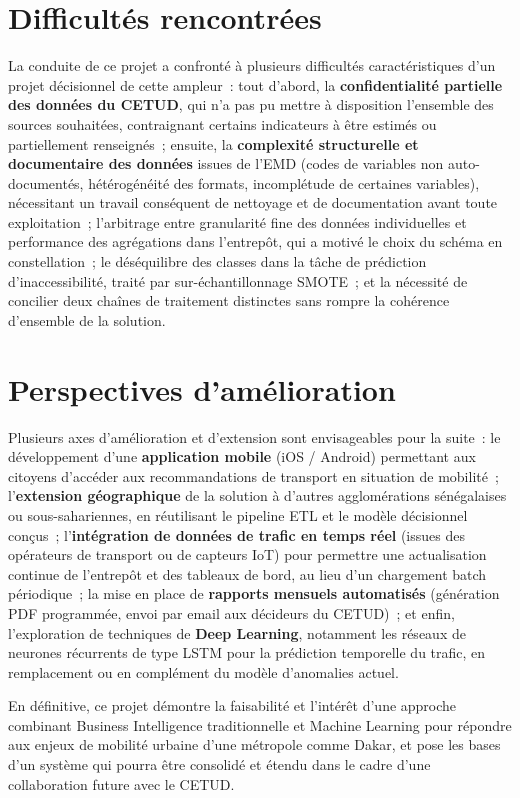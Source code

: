 \section*{Difficultés rencontrées}
La conduite de ce projet a confronté à plusieurs difficultés caractéristiques d'un projet décisionnel de cette ampleur~: tout d'abord, la \textbf{confidentialité partielle des données du CETUD}, qui n'a pas pu mettre à disposition l'ensemble des sources souhaitées, contraignant certains indicateurs à être estimés ou partiellement renseignés~; ensuite, la \textbf{complexité structurelle et documentaire des données} issues de l'EMD (codes de variables non auto-documentés, hétérogénéité des formats, incomplétude de certaines variables), nécessitant un travail conséquent de nettoyage et de documentation avant toute exploitation~; l'arbitrage entre granularité fine des données individuelles et performance des agrégations dans l'entrepôt, qui a motivé le choix du schéma en constellation~; le déséquilibre des classes dans la tâche de prédiction d'inaccessibilité, traité par sur-échantillonnage SMOTE~; et la nécessité de concilier deux chaînes de traitement distinctes sans rompre la cohérence d'ensemble de la solution.

\section*{Perspectives d'amélioration}
Plusieurs axes d'amélioration et d'extension sont envisageables pour la suite~: le développement d'une \textbf{application mobile} (iOS / Android) permettant aux citoyens d'accéder aux recommandations de transport en situation de mobilité~; l'\textbf{extension géographique} de la solution à d'autres agglomérations sénégalaises ou sous-sahariennes, en réutilisant le pipeline ETL et le modèle décisionnel conçus~; l'\textbf{intégration de données de trafic en temps réel} (issues des opérateurs de transport ou de capteurs IoT) pour permettre une actualisation continue de l'entrepôt et des tableaux de bord, au lieu d'un chargement batch périodique~; la mise en place de \textbf{rapports mensuels automatisés} (génération PDF programmée, envoi par email aux décideurs du CETUD)~; et enfin, l'exploration de techniques de \textbf{Deep Learning}, notamment les réseaux de neurones récurrents de type LSTM pour la prédiction temporelle du trafic, en remplacement ou en complément du modèle d'anomalies actuel.

En définitive, ce projet démontre la faisabilité et l'intérêt d'une approche combinant Business Intelligence traditionnelle et Machine Learning pour répondre aux enjeux de mobilité urbaine d'une métropole comme Dakar, et pose les bases d'un système qui pourra être consolidé et étendu dans le cadre d'une collaboration future avec le CETUD.

\clearpage
